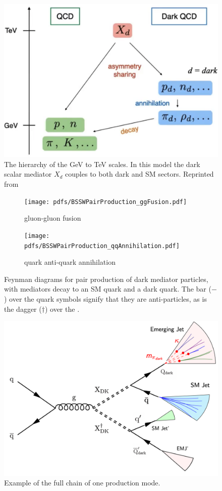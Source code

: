 \begin{figure}
	\centering
	\includegraphics[width=0.8\linewidth]{Images/DarkQCDModel.png}
	\caption[The hierarchy of the GeV to TeV scales.]{The hierarchy of the GeV to TeV scales. In this model the dark scalar mediator $X_d$ couples to both dark and SM sectors. Reprinted from \cite{Schwaller:2015gea}}
	\label{fig:dark-qcdmodel}
\end{figure}


\begin{figure}
	\begin{center}
		\begin{subfigure}{.45\linewidth}
			\texttt{[image: pdfs/BSSWPairProduction\_ggFusion.pdf]}
			\caption{gluon-gluon fusion}
		\end{subfigure}
		\begin{subfigure}{.45\linewidth}
			\texttt{[image: pdfs/BSSWPairProduction\_qqAnnihilation.pdf]}
			\caption{quark anti-quark annihilation}
		\end{subfigure}
	\end{center}
	\caption[Emergin jets production modes]{Feynman diagrams for pair production of dark mediator particles, with mediators decay to an SM quark and a dark quark. The bar ($-$) over the quark symbols signify that they are anti-particles, as is the dagger ($\dagger$) over the \Mdark.}
	\label{fig:emj_production1}
\end{figure}

\begin{figure}
	\centering
	\includegraphics[width=.8\linewidth]{Images/EMJ_production.png}
	\caption{Example of the full chain of one production mode.}
	\label{fig:full-chain}
\end{figure}

